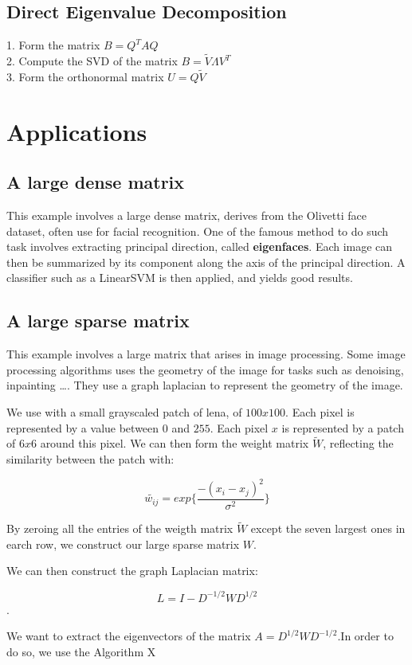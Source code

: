 \documentclass[onecolumn,12pt]{article}
\begin{document}
\subsection{Direct Eigenvalue Decomposition}
1. Form the matrix $B = Q^T A Q$ \\
2. Compute the SVD of the matrix $ B = \tilde{V}\Lambda V^T$ \\
3. Form the orthonormal matrix $U = Q \tilde{V}$ \\


\section{Applications}
\subsection{A large dense matrix}
This example involves a large dense matrix, derives from the Olivetti face
dataset, often use for facial recognition. One of the famous method to do such
task involves extracting principal direction, called \textbf{eigenfaces}. Each
image can then be summarized by its component along the axis of the principal
direction. A classifier such as a LinearSVM is then applied, and yields good
results.




\subsection{A large sparse matrix}

This example involves a large matrix that arises in image processing. Some
image processing algorithms uses the geometry of the image for tasks such as
denoising, inpainting \dots. They use a graph laplacian to represent the
geometry of the image.

We use with a small grayscaled patch of lena, of $100 x 100$. Each pixel is
represented by a value between $0$ and $255$. Each pixel $x$ is represented by
a patch of $6x6$ around this pixel. We can then form the weight matrix
$\tilde{W}$, reflecting the similarity between the patch with:

$$\tilde{w_{ij}} = exp \{ \frac{- (x_i - x_j)^2}{\sigma^2}\}$$

By zeroing all the entries of the weigth matrix $\tilde{W}$ except the seven
largest ones in earch row, we construct our large sparse matrix $W$.

We can then construct the graph Laplacian matrix:

$$L = I - D^{-1/2} W D^{1/2}$$.

We want to extract the eigenvectors of the matrix $A= D^{1/2} W D^{-1/2}$.In
order to do so, we use the Algorithm X
\end{document}
